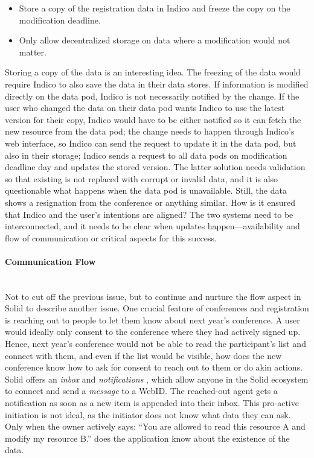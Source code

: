 \begin{itemize}
    \item Store a copy of the registration data in Indico and freeze the copy on the modification deadline.
    \item Only allow decentralized storage on data where a modification would not matter.
\end{itemize}

Storing a copy of the data is an interesting idea. The freezing of the data would require Indico to also save the data in their data stores. If information is modified directly on the data pod, Indico is not necessarily notified by the change. If the user who changed the data on their data pod wants Indico to use the latest version for their copy, Indico would have to be either notified so it can fetch the new resource from the data pod; the change needs to happen through Indico’s web interface, so Indico can send the request to update it in the data pod, but also in their storage; Indico sends a request to all data pods on modification deadline day and updates the stored version. The latter solution needs validation so that existing is not replaced with corrupt or invalid data, and it is also questionable what happens when the data pod is unavailable. Still, the data shows a resignation from the conference or anything similar. How is it ensured that Indico and the user's intentions are aligned? The two systems need to be interconnected, and it needs to be clear when updates happen---availability and flow of communication or critical aspects for this success.
\vspace{0.5cm}
\paragraph{Communication Flow}\mbox{}\\

Not to cut off the previous issue, but to continue and nurture the flow aspect in Solid to describe another issue. One crucial feature of conferences and registration is reaching out to people to let them know about next year's conference. A user would ideally only consent to the conference where they had actively signed up. Hence, next year's conference would not be able to read the participant's list and connect with them, and even if the list would be visible, how does the new conference know how to ask for consent to reach out to them or do akin actions. Solid offers an \textit{inbox} and \textit{notifications} \cite{solid-inbox}, which allow anyone in the Solid ecosystem to connect and send a \textit{message} to a WebID. The reached-out agent gets a notification as soon as a new item is appended into their inbox. This pro-active initiation is not ideal, as the initiator does not know what data they can ask. Only when the owner actively says: “You are allowed to read this resource A and modify my resource B.” does the application know about the existence of the data.


